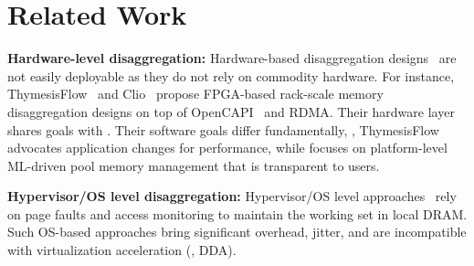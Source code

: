\section{Related Work}
%
\label{sec-rel}



{\ni\bf Hardware-level disaggregation:} Hardware-based
disaggregation designs~\cite{clio.web21, thymesisflow.micro20,
zombieland.eurosys18, pberry.hotos19, dredbox.date16, memblade.isca09,
optmemdisagg} are not easily deployable as they do not rely on commodity
hardware. For instance, ThymesisFlow~\cite{thymesisflow.micro20} and Clio~\cite{clio.web21}
propose FPGA-based rack-scale memory disaggregation designs on top of
{OpenCAPI}~\cite{opencapi.web21} and RDMA. Their hardware layer shares goals with \sys.
Their software goals differ fundamentally, \eg, ThymesisFlow advocates application changes
for performance, while \sys focuses on platform-level ML-driven pool
memory management that is transparent to users.



\vfive
{\ni\bf Hypervisor\slash OS level disaggregation:}
Hypervisor\slash OS level approaches~\cite{sysdisaggmem.hpca12,
    resdisagg.osdi16, infiniswap.nsdi17, legoos.osdi18,
    softfarmem.asplos19, dcm.tc19, fastswap.eurosys20, leap.atc20,
fluidmem.icdcs20, orchdisaggmem.tc20, ememdisagg.corr20}
rely on page faults and access monitoring to maintain the
working set in local DRAM. Such OS-based approaches bring significant
overhead, jitter, and are incompatible with virtualization acceleration
(\eg, DDA).

%

